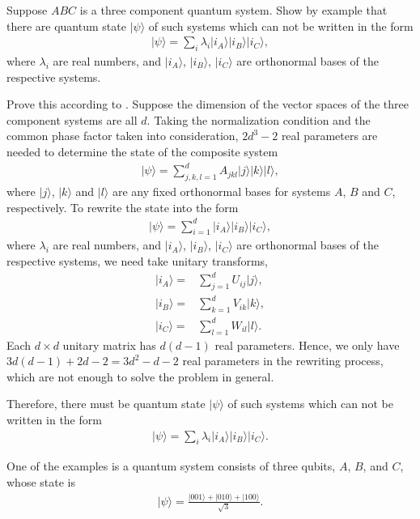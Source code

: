 \documentclass[en]{sol-man}
\begin{document}
\begin{exe}
    Suppose $ABC$ is a three component quantum system. Show by example that there are quantum state $\lvert\psi\rangle$ of such systems which can not be written in the form
    \begin{align}
        \lvert\psi\rangle=\sum_i\lambda_i\lvert i_A\rangle\lvert i_B\rangle\lvert i_C\rangle,
    \end{align}
    where $\lambda_i$ are real numbers, and $\lvert i_A\rangle$, $\lvert i_B\rangle$, $\lvert i_C\rangle$ are orthonormal bases of the respective systems.
\end{exe}
\begin{sol}
    Prove this according to \cite{peres1995higher}. Suppose the dimension of the vector spaces of the three component systems are all $d$. Taking the normalization condition and the common phase factor taken into consideration, $2d^3-2$ real parameters are needed to determine the state of the composite system
    \begin{align}
        \lvert\psi\rangle=\sum_{j,k,l=1}^dA_{jkl}\lvert j\rangle\lvert k\rangle\lvert l\rangle,
    \end{align}
    where $\lvert j\rangle$, $\lvert k\rangle$ and $\lvert l\rangle$ are any fixed orthonormal bases for systems $A$, $B$ and $C$, respectively.
    To rewrite the state into the form
    \begin{align}
        \lvert\psi\rangle=\sum_{i=1}^d\lvert i_A\rangle\lvert i_B\rangle\lvert i_C\rangle,
    \end{align}
    where $\lambda_i$ are real numbers, and $\lvert i_A\rangle$, $\lvert i_B\rangle$, $\lvert i_C\rangle$ are orthonormal bases of the respective systems, we need take unitary transforms,
    \begin{align}
        \lvert i_A\rangle=&\sum_{j=1}^dU_{ij}\lvert j\rangle,\\
        \lvert i_B\rangle=&\sum_{k=1}^dV_{ik}\lvert k\rangle,\\
        \lvert i_C\rangle=&\sum_{l=1}^dW_{il}\lvert l\rangle.
    \end{align}
    Each $d\times d$ unitary matrix has $d(d-1)$ real parameters. Hence, we only have $3d(d-1)+2d-2=3d^2-d-2$ real parameters in the rewriting process, which are not enough to solve the problem in general.

    Therefore, there must be quantum state $\lvert\psi\rangle$ of such systems which can not be written in the form
    \begin{align}
        \lvert\psi\rangle=\sum_i\lambda_i\lvert i_A\rangle\lvert i_B\rangle\lvert i_C\rangle.
    \end{align}

    One of the examples is a quantum system consists of three qubits, $A$, $B$, and $C$, whose state is
    \begin{align}
        \lvert\psi\rangle=\frac{\lvert 001\rangle+\lvert 010\rangle+\lvert 100\rangle}{\sqrt{3}}.
    \end{align}
\end{sol}
\end{document}
